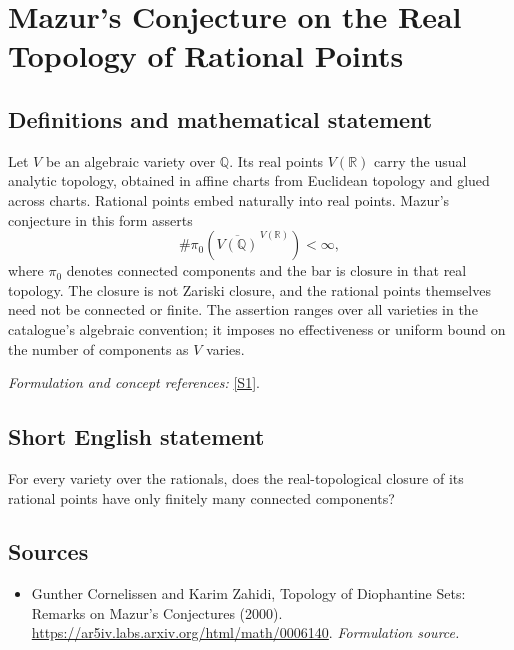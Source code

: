 \documentclass[11pt]{article}
\begin{document}
\section*{\texorpdfstring{Mazur's Conjecture on the Real Topology of Rational Points}{Mazur's Conjecture on the Real Topology of Rational Points}}\label{346}
\subsection{Definitions and mathematical statement}
Let $V$ be an algebraic variety over ${\mathbb{Q}}$. Its real points $V({\mathbb{R}})$ carry the usual analytic topology, obtained in affine charts from Euclidean topology and glued across charts. Rational points embed naturally into real points. Mazur's conjecture in this form asserts
\[
 \#\pi_0\!\left(\overline{V({\mathbb{Q}})}^{\,V({\mathbb{R}})}\right)<\infty,
\]
where $\pi_0$ denotes connected components and the bar is closure in that real topology. The closure is not Zariski closure, and the rational points themselves need not be connected or finite. The assertion ranges over all varieties in the catalogue's algebraic convention; it imposes no effectiveness or uniform bound on the number of components as $V$ varies.
\par\smallskip\textit{Formulation and concept references:} \href{https://ar5iv.labs.arxiv.org/html/math/0006140}{[S1]}.

\subsection{Short English statement}
For every variety over the rationals, does the real-topological closure of its rational points have only finitely many connected components?
\subsection{Sources}
\begin{itemize}
\item[S1]Gunther Cornelissen and Karim Zahidi, Topology of Diophantine Sets: Remarks on Mazur's Conjectures (2000).
\url{https://ar5iv.labs.arxiv.org/html/math/0006140}.
\textit{Formulation source.}
\end{itemize}
\end{document}
